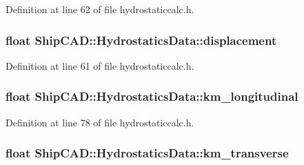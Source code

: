 Definition at line 62 of file hydrostaticcalc.\+h.

\subsubsection[{\texorpdfstring{displacement}{displacement}}]{\setlength{\rightskip}{0pt plus 5cm}float Ship\+C\+A\+D\+::\+Hydrostatics\+Data\+::displacement}\hypertarget{structShipCAD_1_1HydrostaticsData_a92d1a8a97eb9b21bad485e40ac4461a0}{}\label{structShipCAD_1_1HydrostaticsData_a92d1a8a97eb9b21bad485e40ac4461a0}


Definition at line 61 of file hydrostaticcalc.\+h.

\subsubsection[{\texorpdfstring{km\+\_\+longitudinal}{km_longitudinal}}]{\setlength{\rightskip}{0pt plus 5cm}float Ship\+C\+A\+D\+::\+Hydrostatics\+Data\+::km\+\_\+longitudinal}\hypertarget{structShipCAD_1_1HydrostaticsData_a0a51e62f7d169fa892eaabc6a1937256}{}\label{structShipCAD_1_1HydrostaticsData_a0a51e62f7d169fa892eaabc6a1937256}


Definition at line 78 of file hydrostaticcalc.\+h.

\subsubsection[{\texorpdfstring{km\+\_\+transverse}{km_transverse}}]{\setlength{\rightskip}{0pt plus 5cm}float Ship\+C\+A\+D\+::\+Hydrostatics\+Data\+::km\+\_\+transverse}\hypertarget{structShipCAD_1_1HydrostaticsData_adbadaf4eafa63f1f10778f4c3e1f61a4}{}\label{structShipCAD_1_1HydrostaticsData_adbadaf4eafa63f1f10778f4c3e1f61a4}


